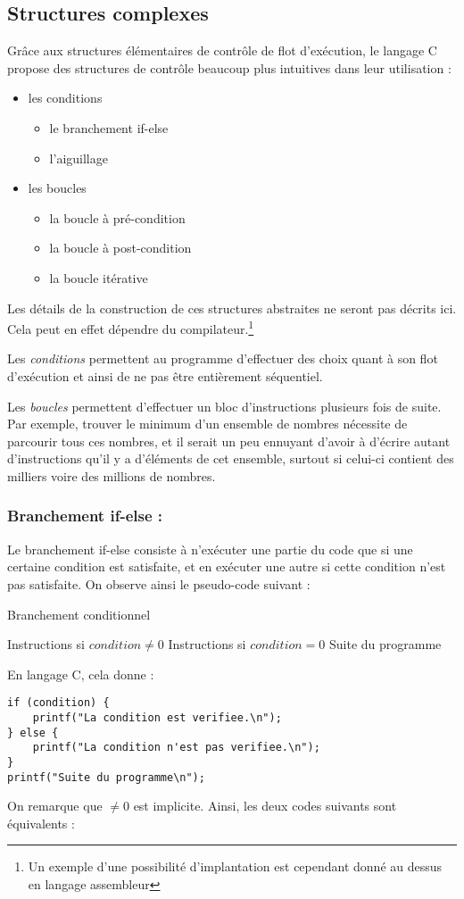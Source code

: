 \documentclass[../../../main.tex]{subfiles}
\begin{document}
\subsection{Structures complexes}
\label{sub:structures_complexes}
Grâce aux structures élémentaires de contrôle de flot d'exécution, le langage C propose des structures de contrôle beaucoup plus intuitives dans leur utilisation :
\begin{itemize}
	\item les conditions
	\begin{itemize}
	\item le branchement \textsf{if-else}
	\item l'aiguillage
	\end{itemize}
	\item les boucles
	\begin{itemize}
		\item la boucle à pré-condition
		\item la boucle à post-condition
		\item la boucle itérative
	\end{itemize}
\end{itemize}
Les détails de la construction de ces structures abstraites ne seront pas décrits ici. Cela peut en effet dépendre du compilateur.\footnote{Un exemple d'une possibilité d'implantation est cependant donné au dessus en langage assembleur}

Les \textit{conditions} permettent au programme d'effectuer des choix quant à son flot d'exécution et ainsi de ne pas être entièrement séquentiel.

Les \textit{boucles} permettent d'effectuer un bloc d'instructions plusieurs fois de suite. Par exemple, trouver le minimum d'un ensemble de nombres nécessite de parcourir tous ces nombres, et il serait un peu ennuyant d'avoir à d'écrire autant d'instructions qu'il y a d'éléments de cet ensemble, surtout si celui-ci contient des milliers voire des millions de nombres.
\subsubsection{Branchement \textsf{if-else} :}
\label{ssub:branchement_if_else}
Le branchement \textsf{if-else} consiste à n'exécuter une partie du code que si une certaine condition est satisfaite, et en exécuter une autre si cette condition n'est pas satisfaite. On observe ainsi le pseudo-code suivant :
\begin{algorithm}
\caption{Branchement conditionnel}
 {
	Instructions si $condition \neq{0}$
} {
	Instructions si $condition = 0$
}
Suite du programme
\end{algorithm}
En langage C, cela donne :
\begin{verbatim}
if (condition) {
	printf("La condition est verifiee.\n");
} else {
	printf("La condition n'est pas verifiee.\n");
}
printf("Suite du programme\n");
\end{verbatim}
On remarque que $\neq{0}$ est implicite. Ainsi, les deux codes suivants sont équivalents :
\end{document}
